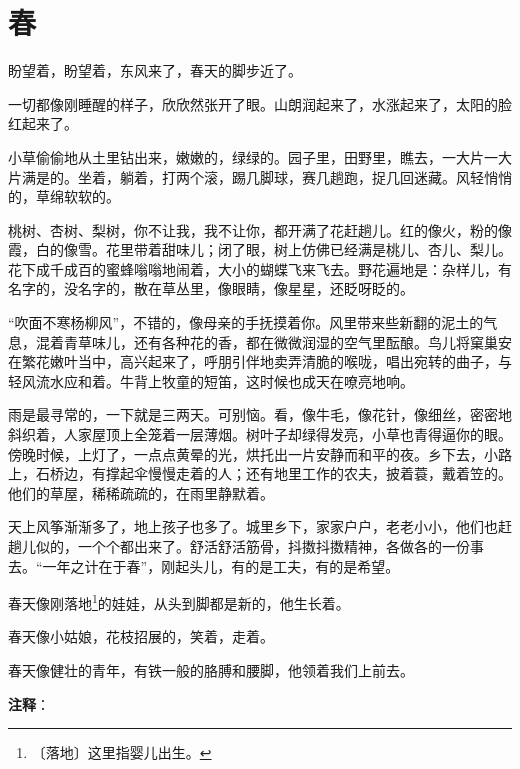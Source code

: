\documentclass[12pt,UTF-8,openany]{ctexbook}
\begin{document}
\chapter{春}

\begin{normalsize}
    
    盼望着，盼望着，东风来了，春天的脚步近了。
    
    一切都像刚睡醒的样子，欣欣然张开了眼。山朗润起来了，水涨起来了，太阳的脸红起来了。
    
    小草偷偷地从土里钻出来，嫩嫩的，绿绿的。园子里，田野里，瞧去，一大片一大片满是的。坐着，躺着，打两个滚，踢几脚球，赛几趟跑，捉几回迷藏。风轻悄悄的，草绵软软的。
    
    桃树、杏树、梨树，你不让我，我不让你，都开满了花赶趟儿。红的像火，粉的像霞，白的像雪。花里带着甜味儿；闭了眼，树上仿佛已经满是桃儿、杏儿、梨儿。花下成千成百的蜜蜂嗡嗡地闹着，大小的蝴蝶飞来飞去。野花遍地是：杂样儿，有名字的，没名字的，散在草丛里，像眼睛，像星星，还眨呀眨的。
    
    “吹面不寒杨柳风”，不错的，像母亲的手抚摸着你。风里带来些新翻的泥土的气息，混着青草味儿，还有各种花的香，都在微微润湿的空气里酝酿。鸟儿将窠巢安在繁花嫩叶当中，高兴起来了，呼朋引伴地卖弄清脆的喉咙，唱出宛转的曲子，与轻风流水应和着。牛背上牧童的短笛，这时候也成天在嘹亮地响。
    
    雨是最寻常的，一下就是三两天。可别恼。看，像牛毛，像花针，像细丝，密密地斜织着，人家屋顶上全笼着一层薄烟。树叶子却绿得发亮，小草也青得逼你的眼。傍晚时候，上灯了，一点点黄晕的光，烘托出一片安静而和平的夜。乡下去，小路上，石桥边，有撑起伞慢慢走着的人；还有地里工作的农夫，披着蓑，戴着笠的。他们的草屋，稀稀疏疏的，在雨里静默着。
    
    天上风筝渐渐多了，地上孩子也多了。城里乡下，家家户户，老老小小，他们也赶趟儿似的，一个个都出来了。舒活舒活筋骨，抖擞抖擞精神，各做各的一份事去。“一年之计在于春”，刚起头儿，有的是工夫，有的是希望。
    
    春天像刚落地\footnote{〔落地〕这里指婴儿出生。}的娃娃，从头到脚都是新的，他生长着。
    
    春天像小姑娘，花枝招展的，笑着，走着。
    
    春天像健壮的青年，有铁一般的胳膊和腰脚，他领着我们上前去。
    
\end{normalsize}


\newpage

\textbf{注释}：

\vspace{-1em}
\end{document}
